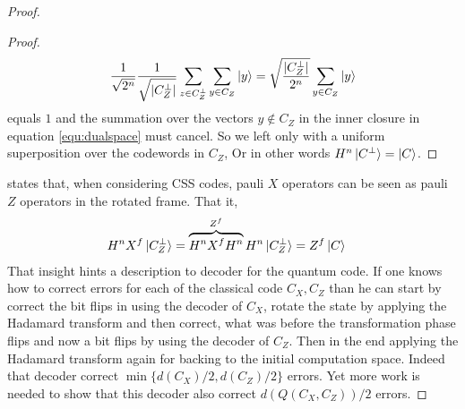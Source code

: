 \begin{proof}
\begin{proof}
       \begin{equation}
         \begin{split}
           \frac{1}{ \sqrt{ 2^{n}}} \frac{1}{\sqrt{|C_{Z}^{\perp}|}} \sum_{z \in C_{Z}^{\perp}}{  \sum_{y \in C_{Z}}{  \ket{y}  }  } = \sqrt{\frac{ |C_{Z}^{\perp}|}{2^{n}}}  \sum_{y \in C_{Z}}{  \ket{y}  }  
         \end{split}
       \end{equation} equals $1$ and the summation over the vectors $y \not\in C_{Z}$ in the inner closure in equation \ref{equ:dualspace} must cancel. So we left only with a uniform superposition over the codewords in $C_{Z}$, Or in other words $H^{n}\ket{C^{\perp}} = \ket{C}$.  
    \end{proof}
   states that, when considering CSS codes,  pauli $X$ operators can be seen as pauli $Z$ operators in the rotated frame. That it, \begin{equation*}
    \begin{split}
      H^{n} X^{f} \ket{ C_{Z}^{\perp} } & =  \overbrace{H^{n}X^{f}H^{n}}^{ Z^{f}} H^{n} \ket{C^{\perp}_{Z} }  = Z^{f}\ket{C}
    \end{split}
  \end{equation*}
  That insight hints a description to decoder for the quantum code. If one knows how to correct errors for each of the classical code $C_{X},C_{Z}$ than he can start by correct the bit flips in using the decoder of $C_{X}$, rotate the state by applying the Hadamard transform and then correct, what was before the transformation phase flips and now a bit flips by using the decoder of $C_{Z}$. Then in  the end applying the Hadamard transform again for backing to the initial computation space. Indeed that decoder correct $ \min \{ d(C_{X})/2 , d\left( C_{Z} \right)/2 \} $ errors. Yet more work is needed to show that this decoder also correct $d\left( Q\left( C_{X}, C_{Z} \right) \right)/ 2$ errors.


\end{proof}
